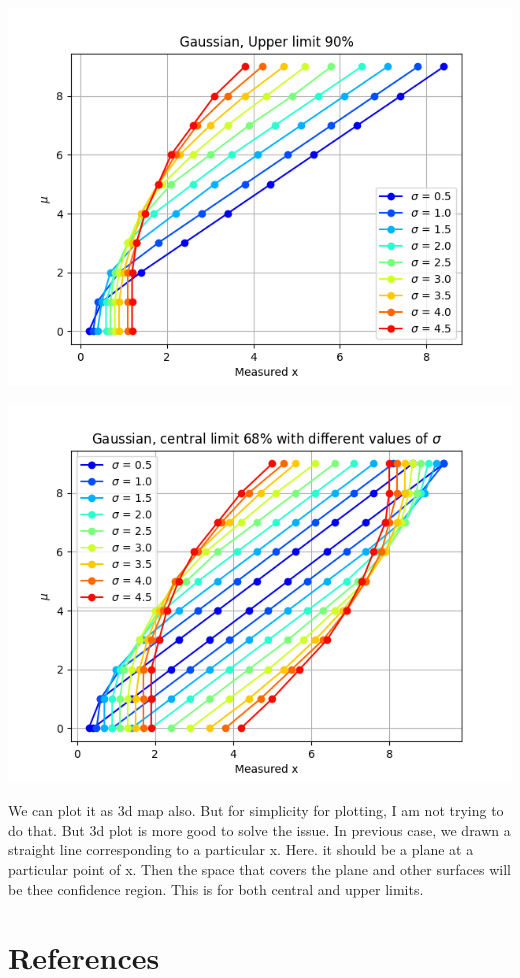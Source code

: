 \documentclass[a4paper,11pt]{article}
\begin{document}
\begin{center}
\includegraphics[width=.9\linewidth]{gaussian_upper_diff_sigma.png}
\end{center}

\begin{center}
\includegraphics[width=.9\linewidth]{gaussian_central_diff_sigma.png}
\end{center}

We can plot it as 3d map also. But for simplicity for plotting, I am not trying to do that. But 3d plot is more good to solve the issue. In previous case, we drawn a straight line corresponding to a particular x. Here. it should be a plane at a particular point of x. Then the space that covers the plane and other surfaces will be thee confidence region. This is for both central and upper limits.

\section*{References}
\label{sec:orgf226db2}


\end{document}
